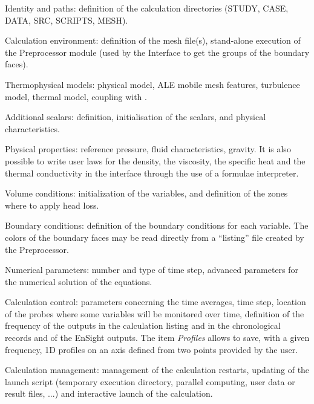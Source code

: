 {{{\begin{list}{-}{}
\item Identity and paths: definition of the calculation directories
      (STUDY, CASE, DATA, SRC, SCRIPTS, MESH).

\item Calculation environment: definition of the mesh file(s),
      stand-alone execution of the Preprocessor module
      (used by the Interface to get the groups of the boundary
      faces).

\item Thermophysical models: physical model, ALE mobile mesh features,
      turbulence model, thermal model, coupling with \syrthes.

\item Additional scalars: definition, initialisation of the scalars,
      and physical characteristics.

\item Physical properties: reference pressure, fluid characteristics, gravity.
      It is also possible to write user laws for the density, the viscosity,
      the specific heat and the thermal conductivity in the interface through
      the use of a formulae interpreter.

\item Volume conditions: initialization of the variables, and definition of
      the zones where to apply head loss.

\item Boundary conditions: definition of the boundary conditions for
      each variable. The colors of the boundary faces may be read
      directly from a ``listing'' file created by the Preprocessor.

\item Numerical parameters: number and type of time step, advanced parameters
      for the numerical solution of the equations.

\item Calculation control: parameters concerning the time averages, time step,
      location of
      the probes where some variables will be monitored over time,
      definition of the frequency of the outputs in the calculation
      listing and in the chronological records and of the EnSight outputs.
      The item {\itshape Profiles} allows to save, with a  given frequency,
      1D profiles on an axis defined from two points provided by the user.

\item Calculation management: management of the calculation restarts,
      updating of the launch script (temporary execution directory, parallel
      computing, user data or result files, ...) and interactive launch of the
      calculation.


\end{list}}}}
